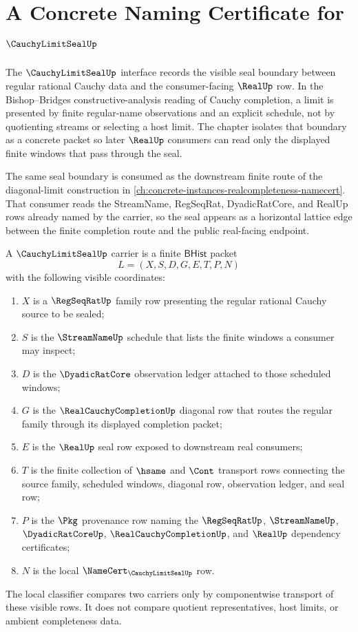 \chapter{A Concrete Naming Certificate for $\CauchyLimitSealUp$}
\label{ch:concrete-instances-cauchylimitseal-namecert}

The $\CauchyLimitSealUp$ interface records the visible seal boundary between regular rational Cauchy data and the consumer-facing $\RealUp$ row. In the Bishop--Bridges constructive-analysis reading of Cauchy completion, a limit is presented by finite regular-name observations and an explicit schedule, not by quotienting streams or selecting a host limit. The chapter isolates that boundary as a concrete packet so later $\RealUp$ consumers can read only the displayed finite windows that pass through the seal.

The same seal boundary is consumed as the downstream finite route of the diagonal-limit construction in \autoref{ch:concrete-instances-realcompleteness-namecert}. That consumer reads the StreamName, RegSeqRat, DyadicRatCore, and RealUp rows already named by the carrier, so the seal appears as a horizontal lattice edge between the finite completion route and the public real-facing endpoint.

\begin{definition}
\label{def:cauchy-limit-seal-carrier}
A $\CauchyLimitSealUp$ carrier is a finite $\mathsf{BHist}$ packet
$$
L=(X,S,D,G,E,T,P,N)
$$
with the following visible coordinates:
\begin{enumerate}
\item $X$ is a $\RegSeqRatUp$ family row presenting the regular rational Cauchy source to be sealed;
\item $S$ is the $\StreamNameUp$ schedule that lists the finite windows a consumer may inspect;
\item $D$ is the $\DyadicRatCore$ observation ledger attached to those scheduled windows;
\item $G$ is the $\RealCauchyCompletionUp$ diagonal row that routes the regular family through its displayed completion packet;
\item $E$ is the $\RealUp$ seal row exposed to downstream real consumers;
\item $T$ is the finite collection of $\hsame$ and $\Cont$ transport rows connecting the source family, scheduled windows, diagonal row, observation ledger, and seal row;
\item $P$ is the $\Pkg$ provenance row naming the $\RegSeqRatUp$, $\StreamNameUp$, $\DyadicRatCoreUp$, $\RealCauchyCompletionUp$, and $\RealUp$ dependency certificates;
\item $N$ is the local $\NameCert_{\CauchyLimitSealUp}$ row.
\end{enumerate}
The local classifier compares two carriers only by componentwise transport of these visible rows. It does not compare quotient representatives, host limits, or ambient completeness data.
\end{definition}

